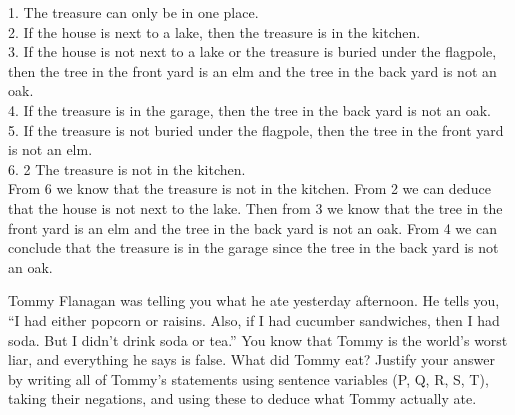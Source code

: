 \documentclass[a4paper]{exam}
\begin{document}
\begin{questions}
\begin{solution}
    1. The treasure can only be in one place.\\
    2. If the house is next to a lake, then the treasure is in the kitchen.\\
    3. If the house is not next to a lake or the treasure is buried under the flagpole, then the tree in the front yard is an elm and the tree in the back yard is not an oak.\\
    4. If the treasure is in the garage, then the tree in the back yard is not an oak. \\
    5. If the treasure is not buried under the flagpole, then the tree in the front yard is not an elm.\\
    6. 2 The treasure is not in the kitchen. \\
    From 6 we know that the treasure is not in the kitchen. From 2 we can deduce that the house is not next to the lake. Then from 3 we know that the tree in the front yard is an elm and the tree in the back yard is not an oak. From 4 we can conclude that the treasure is in the garage since the tree in the back yard is not an oak.
    
  \end{solution}
  
  \question Tommy Flanagan was telling you what he ate yesterday afternoon. He tells you, “I had either popcorn or raisins. Also, if I had cucumber sandwiches, then I had soda. But I didn't drink soda or tea.” You know that Tommy is the world’s worst liar, and everything he says is false. What did Tommy eat?
Justify your answer by writing all of Tommy's statements using sentence variables (P, Q, R, S, T), taking their negations, and using these to deduce what Tommy actually ate.


\end{questions}
\end{document}
